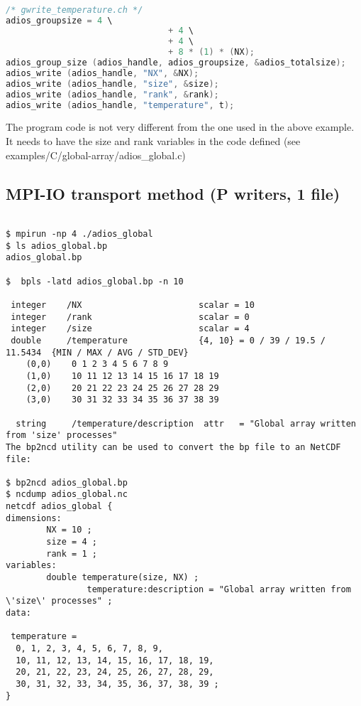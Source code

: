 \begin{lstlisting}[language=C,caption=gwrite header file generated from
  config.xml]

/* gwrite_temperature.ch */
adios_groupsize = 4 \
                                + 4 \
                                + 4 \
                                + 8 * (1) * (NX);
adios_group_size (adios_handle, adios_groupsize, &adios_totalsize);
adios_write (adios_handle, "NX", &NX);
adios_write (adios_handle, "size", &size);
adios_write (adios_handle, "rank", &rank);
adios_write (adios_handle, "temperature", t);

\end{lstlisting}

The program code is not very different from the one used in the above example. 
It needs to have the size and rank variables in the code defined (see examples/C/global-array/adios\_global.c) 

\subsection{MPI-IO transport method (P writers, 1 file)}

\begin{lstlisting}

$ mpirun -np 4 ./adios_global
$ ls adios_global.bp 
adios_global.bp

$  bpls -latd adios_global.bp -n 10
  
 integer    /NX                       scalar = 10
 integer    /rank                     scalar = 0
 integer    /size                     scalar = 4
 double     /temperature              {4, 10} = 0 / 39 / 19.5 / 11.5434  {MIN / MAX / AVG / STD_DEV}
    (0,0)    0 1 2 3 4 5 6 7 8 9
    (1,0)    10 11 12 13 14 15 16 17 18 19
    (2,0)    20 21 22 23 24 25 26 27 28 29
    (3,0)    30 31 32 33 34 35 36 37 38 39

  string     /temperature/description  attr   = "Global array written from 'size' processes"
The bp2ncd utility can be used to convert the bp file to an NetCDF file:

$ bp2ncd adios_global.bp
$ ncdump adios_global.nc 
netcdf adios_global {
dimensions:
        NX = 10 ;
        size = 4 ;
        rank = 1 ;
variables:
        double temperature(size, NX) ;
                temperature:description = "Global array written from \'size\' processes" ;
data:

 temperature =
  0, 1, 2, 3, 4, 5, 6, 7, 8, 9,
  10, 11, 12, 13, 14, 15, 16, 17, 18, 19,
  20, 21, 22, 23, 24, 25, 26, 27, 28, 29,
  30, 31, 32, 33, 34, 35, 36, 37, 38, 39 ;
}
\end{lstlisting}

